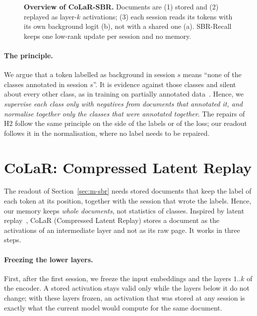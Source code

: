 \begin{figure}[!htbp]
  \centering
  \caption[Overview of CoLaR-SBR]{\textbf{Overview of CoLaR-SBR.} Documents are (1) stored
  and (2) replayed as layer-$k$ activations; (3) each session reads its tokens with its own
  background logit (b), not with a shared one (a). SBR-Recall keeps one low-rank update per
  session and no memory.}
  \label{fig:method}
\end{figure}

\paragraph{The principle.} We argue that a token labelled as background in session $s$ means
``none of the classes annotated in session $s$''. It is evidence against those classes and
silent about every other class, as in training on partially annotated
data~\citep{greenberg2018marginal}. Hence, we \emph{supervise each class only with negatives
from documents that annotated it, and normalise together only the classes that were annotated
together}. The repairs of H2 follow the same principle on the side of the labels or of the
loss; our readout follows it in the normalisation, where no label needs to be repaired.

\section{CoLaR: Compressed Latent Replay}
\label{sec:m-colar}

The readout of Section~\ref{sec:m-sbr} needs stored documents that keep the label of each
token at its position, together with the session that wrote the labels. Hence, our memory
keeps \emph{whole documents}, not statistics of classes. Inspired by latent
replay~\citep{hayes2020remind,pellegrini2020latent}, CoLaR (Compressed Latent Replay) stores a
document as the activations of an intermediate layer and not as its raw page. It works in
three steps.

\paragraph{Freezing the lower layers.} First, after the first session, we freeze the input
embeddings and the layers $1..k$ of the encoder. A stored activation stays valid only while
the layers below it do not change; with these layers frozen, an activation that was stored at
any session is exactly what the current model would compute for the same document.


